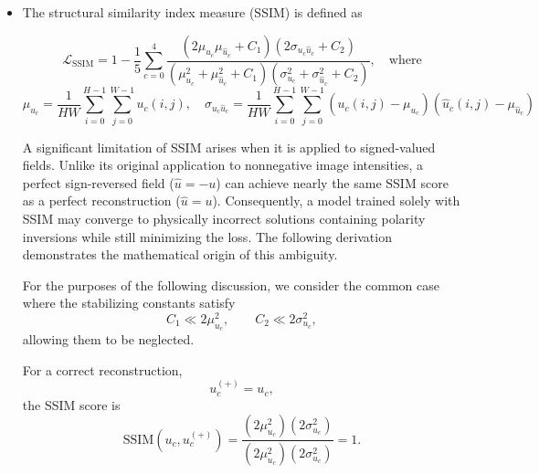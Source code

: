 \documentclass[preprint,review,12pt,numafflabel]{elsarticle}
\begin{document}
\begin{itemize}
\item The structural similarity index measure (SSIM) is defined as

\begin{equation*}
\mathcal{L}_{\text{SSIM}}
=
1
-
\frac{1}{5}
\sum_{c=0}^{4}
\frac{
\left(2\mu_{u_c}\mu_{\hat{u}_c}+C_1\right)\left(2\sigma_{u_c\hat{u}_c}+C_2\right)
}{
\left(\mu_{u_c}^2+\mu_{\hat{u}_c}^2+C_1\right)\left(\sigma_{u_c}^2+\sigma_{\hat{u}_c}^2+C_2\right)
}, \quad \text{where}
\end{equation*}
\begin{equation*}
\mu_{u_c}=\frac{1}{HW}\sum_{i=0}^{H-1}\sum_{j=0}^{W-1}u_c(i,j), \quad
\sigma_{u_c\hat{u}_c}=\frac{1}{HW}\sum_{i=0}^{H-1}\sum_{j=0}^{W-1}\left(u_c(i,j)-\mu_{u_c}\right)\left(\hat{u}_c(i,j)-\mu_{\hat{u}_c}\right)
\end{equation*}

A significant limitation of SSIM arises when it is applied to signed-valued fields. Unlike its original application to nonnegative image intensities, a perfect sign-reversed field ($\hat{u}=-u$) can achieve nearly the same SSIM score as a perfect reconstruction ($\hat{u}=u$). Consequently, a model trained solely with SSIM may converge to physically incorrect solutions containing polarity inversions while still minimizing the loss. The following derivation demonstrates the mathematical origin of this ambiguity.

For the purposes of the following discussion, we consider the common case where the stabilizing constants satisfy
\begin{equation*}
    C_1 \ll 2\mu_{u_c}^2,
    \qquad
    C_2 \ll 2\sigma_{u_c}^2,
\end{equation*}
allowing them to be neglected.

For a correct reconstruction,
\begin{equation*}
    u_c^{(+)} = u_c,
\end{equation*}
the SSIM score is
\begin{equation*}
\mathrm{SSIM}(u_c,u_c^{(+)})
=
\frac{\left(2\mu_{u_c}^2\right)\left(2\sigma_{u_c}^2\right)}
{\left(2\mu_{u_c}^2\right)\left(2\sigma_{u_c}^2\right)}
=1.
\end{equation*}


\end{itemize}
\end{document}
